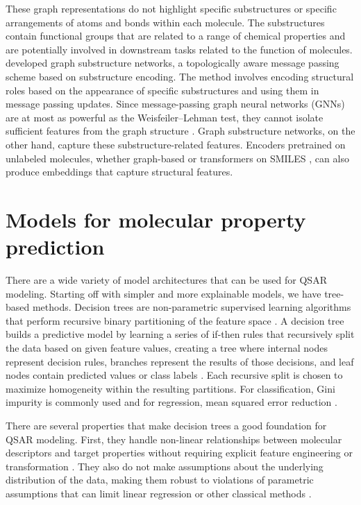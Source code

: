 These graph representations do not highlight specific substructures or specific arrangements of atoms and bonds within each molecule. The substructures contain functional groups that are related to a range of chemical properties and are potentially involved in downstream tasks related to the function of molecules. \citet{Bouritsas2023} developed graph substructure networks, a topologically aware message passing scheme based on substructure encoding. The method involves encoding structural roles based on the appearance of specific substructures and using them in message passing updates. Since message-passing graph neural networks (GNNs) are at most as powerful as the Weisfeiler--Lehman test, they cannot isolate sufficient features from the graph structure \citep{Bouritsas2023}. Graph substructure networks, on the other hand, capture these substructure-related features. Encoders pretrained on unlabeled molecules, whether graph-based \citep{kishimoto2023} or transformers on SMILES \citep{ross2022}, can also produce embeddings that capture structural features. 

\section{Models for molecular property prediction}

There are a wide variety of model architectures that can be used for QSAR modeling. Starting off with simpler and more explainable models, we have tree-based methods. Decision trees are non-parametric supervised learning algorithms that perform recursive binary partitioning of the feature space \citep{Breiman1984}. A decision tree builds a predictive model by learning a series of if-then rules that recursively split the data based on given feature values, creating a tree  where internal nodes represent decision rules, branches represent the results of those decisions, and leaf nodes contain predicted values or class labels \citep{Breiman1984}. Each recursive split is chosen to maximize  homogeneity within the resulting partitions. For classification, Gini impurity is commonly used and for regression, mean squared error reduction \citep{Breiman1984}.

There are several properties that make decision trees a good foundation for QSAR modeling. First, they handle non-linear relationships between molecular descriptors and target properties without requiring explicit feature engineering or transformation \citep{Breiman1984}. They also do not make assumptions about the underlying distribution of the data, making them robust to violations of parametric assumptions that can limit linear regression or other classical methods \citep{Svetnik2003}. 

